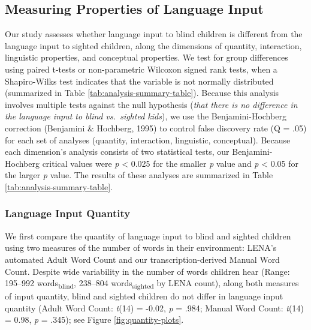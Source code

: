 \documentclass[
  man]{apa6}
\begin{document}
\hypertarget{measuring-properties-of-language-input}{%
\subsection{Measuring Properties of Language Input}\label{measuring-properties-of-language-input}}

Our study assesses whether language input to blind children is different from the language input to sighted children, along the dimensions of quantity, interaction, linguistic properties, and conceptual properties. We test for group differences using paired t-tests or non-parametric Wilcoxon signed rank tests, when a Shapiro-Wilks test indicates that the variable is not normally distributed (summarized in Table \ref{tab:analysis-summary-table}). Because this analysis involves multiple tests against the null hypothesis (\emph{that there is no difference in the language input to blind vs.~sighted kids}), we use the Benjamini-Hochberg correction (Benjamini \& Hochberg, 1995) to control false discovery rate (Q = .05) for each set of analyses (quantity, interaction, linguistic, conceptual). Because each dimension's analysis consists of two statistical tests, our Benjamini-Hochberg critical values were \emph{p} \textless{} 0.025 for the smaller \emph{p} value and \emph{p} \textless{} 0.05 for the larger \emph{p} value. The results of these analyses are summarized in Table \ref{tab:analysis-summary-table}.

\hypertarget{language-input-quantity}{%
\subsubsection{Language Input Quantity}\label{language-input-quantity}}

We first compare the quantity of language input to blind and sighted children using two measures of the number of words in their environment: LENA's automated Adult Word Count and our transcription-derived Manual Word Count. Despite wide variability in the number of words children hear (Range: 195--992 words\textsubscript{blind}, 238--804 words\textsubscript{sighted} by LENA count), along both measures of input quantity, blind and sighted children do not differ in language input quantity (Adult Word Count: \emph{t}(14) = -0.02, \emph{p} = .984; Manual Word Count: \emph{t}(14) = 0.98, \emph{p} = .345); see Figure \ref{fig:quantity-plots}.
\end{document}
